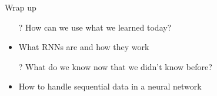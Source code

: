 \documentclass[aspectratio=169]{beamer}
\begin{document}
\begin{frame}{Wrap up}
\begin{itemize}
	\item[?] How can we use what we learned today?
	\item What RNNs are and how they work
	\vspace{2em}
	\item[?] What do we know now that we didn't know before?
	\item How to handle sequential data in a neural network
\end{itemize}


\end{frame}
\end{document}
